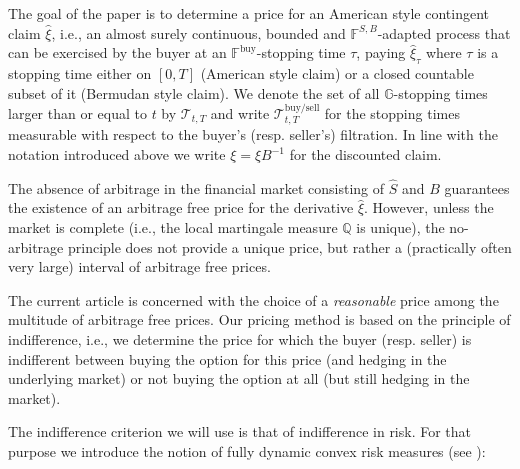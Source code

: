 \documentclass{article}
\newcommand{\Q}{\mathbb{Q}}
\begin{document}
The goal of the paper is to determine a price for an American style contingent claim $\hat{\xi}$, i.e., an almost surely continuous, bounded and $\mathbb{F}^{S,B}$-adapted process that can be exercised by the buyer at an $\mathbb{F}^\text{buy}$-stopping time $\tau$, paying $\hat{\xi}_\tau$ where $\tau$ is a stopping time either on $[0,T]$ (American style claim) or a closed countable subset of it (Bermudan style claim). We denote the set of all $\mathbb{G}$-stopping times larger than or equal to $t$ by $\mathcal{T}_{t,T}$ and write $\mathcal{T}_{t,T}^{\text{buy/sell}}$ for the stopping times measurable with respect to the buyer's (resp. seller's) filtration. In line with the notation introduced above we write $\xi = \hat{\xi}B^{-1}$ for the discounted claim.

The absence of arbitrage in the financial market consisting of $\hat{S}$ and $B$ guarantees the existence of an arbitrage free price for the derivative $\hat{\xi}$. However, unless the market is complete (i.e., the local martingale measure $\Q$ is unique), the no-arbitrage principle does not provide a unique price, but rather a (practically often very large) interval of arbitrage free prices.

The current article is concerned with the choice of a \textit{reasonable} price among the multitude of arbitrage free prices. Our pricing method is based on the principle of indifference, i.e., we determine the price for which the buyer (resp. seller) is indifferent between buying the option for this price (and hedging in the underlying market) or not buying the option at all (but still hedging in the market).

The indifference criterion we will use is that of indifference in risk. For that purpose we introduce the notion of fully dynamic convex risk measures (see \cite{BNDN20}):
	
\end{document}
